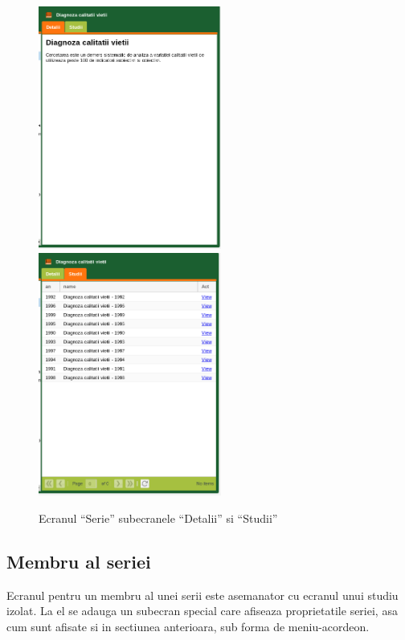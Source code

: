 \begin{figure}[H]
\begin{centering}
\includegraphics[width=6cm]{screenshots/details-panel-series-details}\includegraphics[width=6cm]{screenshots/details-panel-series-studies}
\par\end{centering}
\caption{Ecranul ``Serie'' subecranele ``Detalii'' si ``Studii''}
\end{figure}

\subsection{Membru al seriei}

Ecranul pentru un membru al unei serii este asemanator cu ecranul
unui studiu izolat. La el se adauga un subecran special care afiseaza
proprietatile seriei, asa cum sunt afisate si in sectiunea anterioara,
sub forma de meniu-acordeon.

